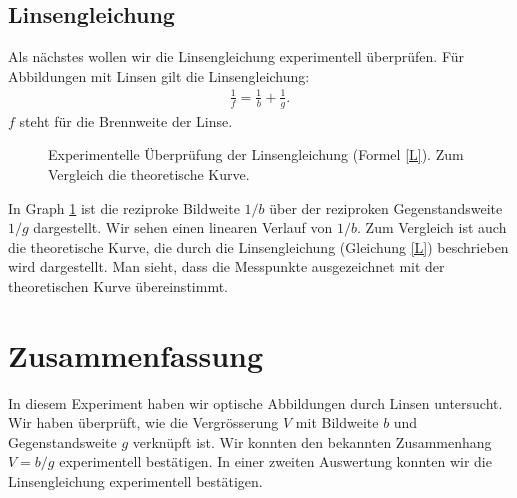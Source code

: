 \documentclass[11pt,a4paper]{article}
\begin{document}
\subsection{Linsengleichung}
Als nächstes wollen wir die Linsengleichung experimentell überprüfen. Für Abbildungen mit Linsen gilt
die Linsengleichung:
\begin{eqnarray}
	\frac{1}{f} = \frac{1}{b} + \frac{1}{g}\text{.}
	\label{L}
\end{eqnarray}
$f$ steht für die Brennweite der Linse.


\begin{figure}[h]

\caption{\label{fig1} Experimentelle Überprüfung der Linsengleichung (Formel \ref{L}). Zum Vergleich die theoretische Kurve.} 
\end{figure}

In Graph \ref{fig1} ist die reziproke Bildweite $1/b$ über der reziproken Gegenstandsweite $1/g$ dargestellt.
Wir sehen einen linearen Verlauf von $1/b$. Zum Vergleich ist auch die theoretische Kurve, die durch die Linsengleichung (Gleichung \ref{L})
beschrieben wird dargestellt. Man sieht, dass die Messpunkte ausgezeichnet mit der theoretischen Kurve übereinstimmt.

\section{Zusammenfassung}
In diesem Experiment haben wir optische Abbildungen durch Linsen untersucht.
Wir haben überprüft, wie die Vergrösserung $V$ mit Bildweite $b$ und Gegenstandsweite $g$ verknüpft ist. 
Wir konnten den bekannten Zusammenhang $V=b/g$ experimentell bestätigen.
In einer zweiten Auswertung konnten wir die Linsengleichung experimentell bestätigen.
\end{document}
